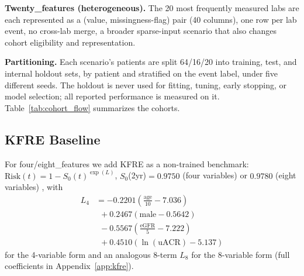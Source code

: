 \textbf{Twenty\_features (heterogeneous).} The 20 most frequently measured labs are each represented as a (value, missingness-flag) pair (40 columns), one row per lab event, no cross-lab merge, a broader sparse-input scenario that also changes cohort eligibility and representation.

\textbf{Partitioning.} Each scenario's patients are split 64/16/20 into training, test, and internal holdout sets, by patient and stratified on the event label, under five different seeds. The holdout is never used for fitting, tuning, early stopping, or model selection; all reported performance is measured on it. Table~\ref{tab:cohort_flow} summarizes the cohorts.

\begin{table}[t]
\centering
\scriptsize
\setlength{\tabcolsep}{2.5pt}
\caption{Cohort flow: source population vs.\ each scenario's final cohort. Split counts are for repetition 1.}
\label{tab:cohort_flow}
\end{table}

\subsection{KFRE Baseline} \label{sec:kfre}
For four/eight\_features we add KFRE as a non-trained benchmark: $\mathrm{Risk}(t)=1-S_0(t)^{\exp(L)}$, $S_0$(2yr)$=0.9750$ (four variables) or $0.9780$ (eight variables) \citep{tangri2016multinational}, with
\begin{align}
L_4 &= -0.2201(\tfrac{\text{age}}{10}{-}7.036) \nonumber \\
&\ \ + 0.2467(\text{male}{-}0.5642) \nonumber \\
&\ \ -0.5567(\tfrac{\text{eGFR}}{5}{-}7.222) \nonumber \\
&\ \ + 0.4510(\ln(\text{uACR}){-}5.137)
\end{align}
for the 4-variable form and an analogous 8-term $L_8$ for the 8-variable form \citep{tangri2011predicting} (full coefficients in Appendix~\ref{app:kfre}).

